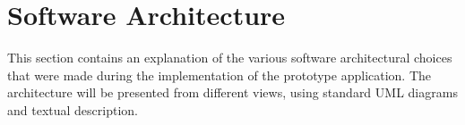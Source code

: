 \begin{comment}
We chose to use the Madgwick algorithm\cite{madgwick}. This choice was based on the fact that a master thesis by Tryggestad\cite{Tryggestad} had used the same algorithm for Wii Remote orientation successfully. A C\# implementation of the algorithm is available at the x-io Technologies Limited website \cite{opensourceMadgwick}, we used this as a basis for the Java implementation of the algorithm which is used in our application. The constructor of the algorithm requires two parameters a sample periode and an algorithm gain beta. The sample period was set to 1f/100f and the algorithm gain beta was set to 0,5f. Sample periode is equal to the refresh rate of the Wii Remote and the beta is based on findings by Tryggestad. These values proved to be satisfactory for us as well.

\begin{figure}[h!]
  \centering
    \texttt{[image: wiimoteAxis.png]}
    \caption{\footnotesize A visual representation of the coordinate system for the Wii Remote, taken from a report by Tryggestad.\cite{Tryggestad}.}
\end{figure}


The algorithm update method requires six parameters: The first three are the gyroscope's X, Y, and Z axis measurements provided in radians/, the following three are the accelerometers X Y Z in any calibrated unit. We discovered that what is defined as yaw, pitch, and roll is not universal, and which axis each corresponds to might be different for aviation and gaming controllers. Rotation about the X axis corresponds pitch, Y corresponds roll and Z corresponds to yaw such as shown in %
The algorithm returns the result as a Quaternion that need to be stored and converted to Euler angles. The formulas for converting the Quaternion to Euler angles are provided in the Madgwick paper. The formula for roll is incorrect in the paper, providing us with incorrect values, Tryggestads calculation was used for the roll conversion. The change was minor as Madgwick uses the wrong quaternion unit for roll calculation.

\end{comment}

\section{Software Architecture}
This section contains an explanation of the various software architectural choices that were made during the implementation of the prototype application. The architecture will be presented from different views, using standard UML diagrams and textual description.

